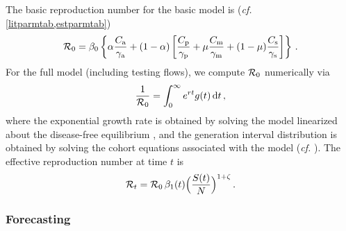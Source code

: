 \documentclass[12pt]{article}\usepackage[]{graphicx}\usepackage[]{color}
\begin{document}
The basic reproduction number for the basic model is (\emph{cf.}\/
\cref{litparmtab,estparmtab})  
\begin{equation}\label{eq:R0}
{\mathcal R}_0 = \beta_0 \left\{
\alpha \frac{C_{\rm a}}{\gamma_{\rm a}}
+
(1-\alpha)\left[ \frac{C_{\rm p}}{\gamma_{\rm p}}
  + \mu\frac{C_{\rm m}}{\gamma_{\rm m}}
  + (1-\mu)\frac{C_{\rm s}}{\gamma_{\rm s}} \right]
  \right\} \,.
\end{equation}
For the full model (including testing flows), we compute ${\mathcal R}_0$
numerically via \cite{WallLips07}
\begin{equation}
\frac{1}{{\mathcal R}_0} = \int_0^\infty e^{rt} g(t)\,{\rm d}t \,,
\end{equation}
where the exponential growth rate is obtained by solving the model
linearized about the disease-free equilibrium \cite{Ma+14}, and the
generation interval distribution is obtained by solving the cohort
equations associated with the model (\emph{cf.}\/
\cite{Cham+18}).
The effective reproduction number at time $t$ is
\begin{equation}\label{eq:Rt}
{\mathcal R}_t = {\mathcal R}_0\, \beta_1(t) \Big(\frac{S(t)}{N}\Big)^{1+\zeta}\,.
\end{equation}

\subsubsection*{Forecasting}
\end{document}
